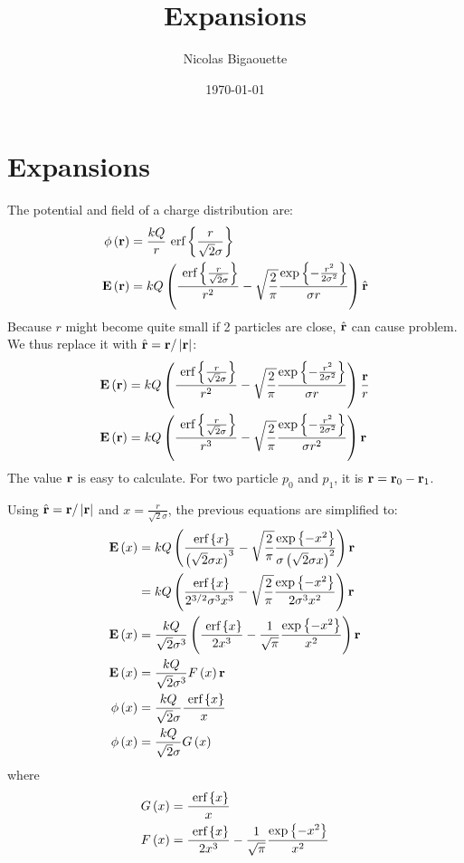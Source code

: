\documentclass[12pt,letterpaper]{article}
\title{Expansions}
\date{\today}
\author{Nicolas Bigaouette}
\begin{document}
\maketitle



\section{Expansions}
The potential and field of a charge distribution are:
\begin{align}
\phi\left( \textbf{r} \right) & = \frac{k Q}{r} ~\textrm{erf} \left\{\frac{r}{\sqrt{2} \sigma}\right\}
\\
\textbf{E}\left( \textbf{r} \right)  & = k Q \left( 
    \frac{ ~\textrm{erf} \left\{\frac{r}{\sqrt{2} \sigma}\right\} }{r^2}
    - \sqrt{ \frac{2}{\pi} } \frac{ \exp{ \left\{  -\frac{r^2}{2 \sigma^2}  \right\}} }{\sigma r}
 \right) \hat{\textbf{r}}
\end{align}
Because $r$ might become quite small if 2 particles are close, $\hat{\textbf{r}}$ can cause problem.
We thus replace it with $\hat{\textbf{r}} = \textbf{r} / \left| \textbf{r} \right|$:
\begin{align}
\textbf{E}\left( \textbf{r} \right)  & = k Q \left( 
    \frac{ ~\textrm{erf} \left\{\frac{r}{\sqrt{2} \sigma}\right\} }{r^2}
    - \sqrt{ \frac{2}{\pi} } \frac{ \exp{ \left\{  -\frac{r^2}{2 \sigma^2}  \right\}} }{\sigma r}
 \right) \frac{\textbf{r}}{r}
\\
\textbf{E}\left( \textbf{r} \right)  & = k Q \left( 
    \frac{ ~\textrm{erf} \left\{\frac{r}{\sqrt{2} \sigma}\right\} }{r^3}
    - \sqrt{ \frac{2}{\pi} } \frac{ \exp{ \left\{  -\frac{r^2}{2 \sigma^2}  \right\}} }{\sigma r^2}
 \right) \textbf{r}
\end{align}
The value $\textbf{r}$ is easy to calculate. For two particle $p_0$ and $p_1$, it is $\textbf{r} = \textbf{r}_0 - \textbf{r}_1$.

Using $\hat{\textbf{r}} = \textbf{r} / \left| \textbf{r} \right|$ and $x = \frac{r}{\sqrt{2} \sigma}$, the previous equations
are simplified to:
\begin{align}
\textbf{E}\left( x \right)
& = k Q \left( 
    \frac{ ~\textrm{erf} \left\{x\right\} }{\left( \sqrt{2} \sigma x \right)^3}
    - \sqrt{ \frac{2}{\pi} } \frac{ \exp{ \left\{ -x^2 \right\}} }{\sigma \left( \sqrt{2} \sigma x \right)^2}
 \right) \textbf{r}
\nonumber \\
& = k Q \left( 
    \frac{ ~\textrm{erf} \left\{x\right\} }{2^{3/2} \sigma^3 x^3}
    - \sqrt{ \frac{2}{\pi} } \frac{ \exp{ \left\{ -x^2 \right\}} }{2 \sigma^3 x^2}
 \right) \textbf{r}
\nonumber \\
\textbf{E}\left( x \right)
& = \frac{k Q}{\sqrt{2} \sigma^3} \left( 
    \frac{ ~\textrm{erf} \left\{x\right\} }{2 x^3}
    - \frac{1}{\sqrt{\pi}} \frac{ \exp{ \left\{ -x^2 \right\}} }{x^2}
 \right) \textbf{r}
\nonumber \\
\textbf{E}\left( x \right)
& = \frac{k Q}{\sqrt{2} \sigma^3} F\left( x \right) \textbf{r}
\\
\phi\left( x \right) & = \frac{k Q}{\sqrt{2} \sigma} \frac{~\textrm{erf} \left\{x\right\}}{x}
\\
\phi\left( x \right) & = \frac{k Q}{\sqrt{2} \sigma} G\left( x \right)
\end{align}
where
\begin{align}
G\left( x \right) & = \frac{~\textrm{erf} \left\{x\right\}}{x} \\
F\left( x \right) & = \frac{ ~\textrm{erf} \left\{x\right\} }{2 x^3} - \frac{1}{\sqrt{\pi}} \frac{ \exp{ \left\{ -x^2 \right\}} }{x^2}
\end{align}
\end{document}

